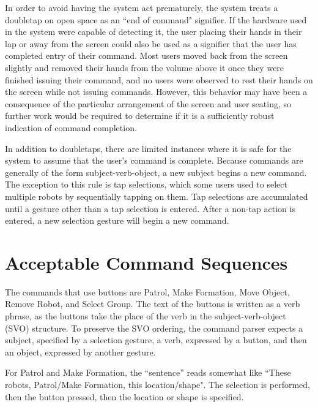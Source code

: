 In order to avoid having the system act prematurely, the system treats a doubletap on open space as an ``end of command" signifier.
If the hardware used in the system were capable of detecting it, the user placing their hands in their lap or away from the screen could also be used as a signifier that the user has completed entry of their command. 
Most users moved back from the screen slightly and removed their hands from the volume above it once they were finished issuing their command, and no users were observed to rest their hands on the screen while not issuing commands. 
However, this behavior may have been a consequence of the particular arrangement of the screen and user seating, so further work would be required to determine if it is a sufficiently robust indication of command completion. 

In addition to doubletaps, there are limited instances where it is safe for the system to assume that the user's command is complete. 
Because commands are generally of the form subject-verb-object, a new subject begins a new command. 
The exception to this rule is tap selections, which some users used to select multiple robots by sequentially tapping on them. 
Tap selections are accumulated until a gesture other than a tap selection is entered.
After a non-tap action is entered, a new selection gesture will begin a new command. 

\section{Acceptable Command Sequences}

The commands that use buttons are Patrol, Make Formation, Move Object, Remove Robot, and Select Group. 
The text of the buttons is written as a verb phrase, as the buttons take the place of the verb in the subject-verb-object (SVO) structure. 
To preserve the SVO ordering, the command parser expects a subject, specified by a selection gesture, a verb, expressed by a button, and then an object, expressed by another gesture. 

For Patrol and Make Formation, the ``sentence'' reads somewhat like ``These robots, Patrol/Make Formation, this location/shape". 
The selection is performed, then the button pressed, then the location or shape is specified. 

